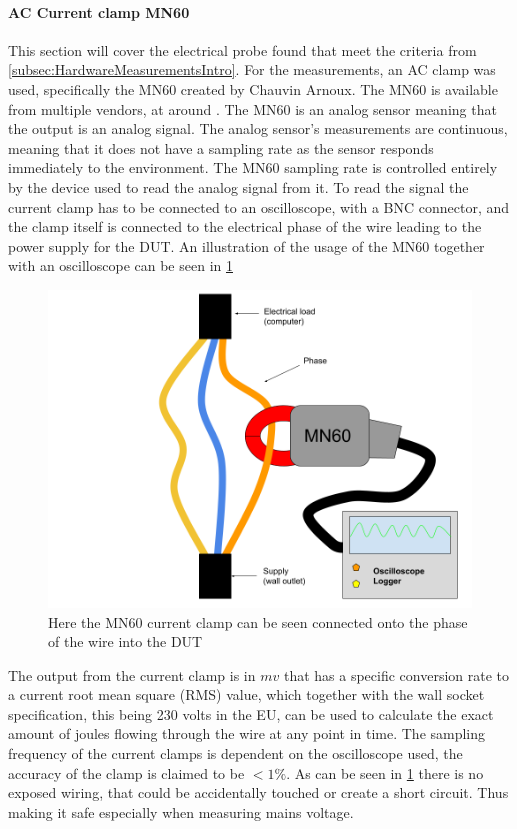 \paragraph*{AC Current clamp MN60}

This section will cover the electrical probe found that meet the criteria from \cref{subsec:HardwareMeasurementsIntro}. For the measurements, an AC clamp was used, specifically the MN60 created by Chauvin Arnoux\cite{ChauvinArnoux}. The MN60 is available from multiple vendors, at around . The MN60 is an analog sensor meaning that the output is an analog signal. The analog sensor's measurements are continuous, meaning that it does not have a sampling rate as the sensor responds immediately to the environment\cite{agarwal2005foundations}. The MN60 sampling rate is controlled entirely by the device used to read the analog signal from it\cite{agarwal2005foundations}. To read the signal the current clamp has to be connected to an oscilloscope, with a BNC connector\cite{ClampDoc}, and the clamp itself is connected to the electrical phase of the wire leading to the power supply for the DUT. An illustration of the usage of the MN60 together with an oscilloscope can be seen in \cref{fig:clampSetup}

\begin{figure}[ht]
    \centering
    \includegraphics*[scale=0.25]{figures/CLAMP.png}
    \caption{Here the MN60 current clamp can be seen connected onto the phase of the wire into the DUT}
    \label{fig:clampSetup}
\end{figure}

The output from the current clamp is in $mv$ that has a specific conversion rate to a current root mean square (RMS) value, which together with the wall socket specification, this being 230 volts in the EU\cite{sik}, can be used to calculate the exact amount of joules flowing through the wire at any point in time. The sampling frequency of the current clamps is dependent on the oscilloscope used, the accuracy of the clamp is claimed to be $<1\%$\cite{ClampDoc}. As can be seen in \ref{fig:clampSetup} there is no exposed wiring, that could be accidentally touched or create a short circuit. Thus making it safe especially when measuring mains voltage.


